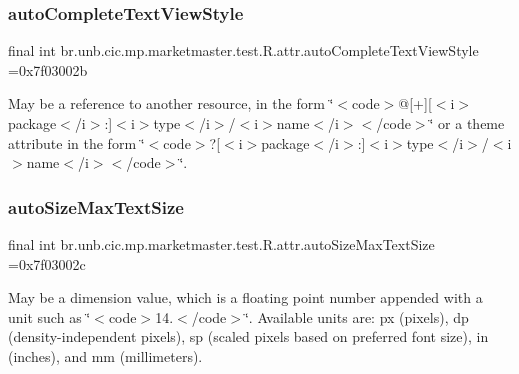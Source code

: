 \subsubsection{\texorpdfstring{auto\+Complete\+Text\+View\+Style}{autoCompleteTextViewStyle}}
{\footnotesize\ttfamily final int br.\+unb.\+cic.\+mp.\+marketmaster.\+test.\+R.\+attr.\+auto\+Complete\+Text\+View\+Style =0x7f03002b\hspace{0.3cm}{\ttfamily [static]}}

May be a reference to another resource, in the form \char`\"{}$<$code$>$@\mbox{[}+\mbox{]}\mbox{[}$<$i$>$package$<$/i$>$\+:\mbox{]}$<$i$>$type$<$/i$>$/$<$i$>$name$<$/i$>$$<$/code$>$\char`\"{} or a theme attribute in the form \char`\"{}$<$code$>$?\mbox{[}$<$i$>$package$<$/i$>$\+:\mbox{]}$<$i$>$type$<$/i$>$/$<$i$>$name$<$/i$>$$<$/code$>$\char`\"{}. \mbox{\label{classbr_1_1unb_1_1cic_1_1mp_1_1marketmaster_1_1test_1_1R_1_1attr_a56ac8a40aadd7ae50668e7139e6d68fd}} 
\subsubsection{\texorpdfstring{auto\+Size\+Max\+Text\+Size}{autoSizeMaxTextSize}}
{\footnotesize\ttfamily final int br.\+unb.\+cic.\+mp.\+marketmaster.\+test.\+R.\+attr.\+auto\+Size\+Max\+Text\+Size =0x7f03002c\hspace{0.3cm}{\ttfamily [static]}}

May be a dimension value, which is a floating point number appended with a unit such as \char`\"{}$<$code$>$14.\+5sp$<$/code$>$\char`\"{}. Available units are\+: px (pixels), dp (density-\/independent pixels), sp (scaled pixels based on preferred font size), in (inches), and mm (millimeters). \mbox{\label{classbr_1_1unb_1_1cic_1_1mp_1_1marketmaster_1_1test_1_1R_1_1attr_ad16187e50947731c5babce8d2f1d77a3}} 
